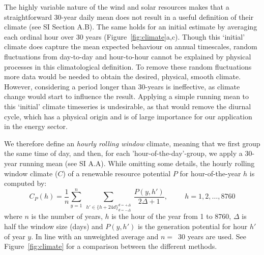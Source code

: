 \documentclass[12pt]{iopart}
\begin{document}
The highly variable nature of the wind and solar resources makes that a straightforward 30-year daily mean does not result in a useful definition of their climate (see SI Section A.B). 
The same holds for an initial estimate by averaging each ordinal hour over 30 years (Figure~\ref{fig:climate}a,c). 
Though this `initial' climate does capture the mean expected behaviour on annual timescales, random fluctuations from day-to-day and hour-to-hour cannot be explained by physical processes in this climatological definition. 
To remove these random fluctuations more data would be needed to obtain the desired, physical, smooth climate. 
However, considering a period longer than 30-years is ineffective, as climate change would start to influence the result. 
Applying a simple running mean to this `initial' climate timeseries is undesirable, as that would remove the diurnal cycle, which has a physical origin and is of large importance for our application in the energy sector.

We therefore define an \emph{hourly rolling window} climate, meaning that we first group the same time of day, and then, for each 'hour-of-the-day'-group, we apply a 30-year running mean (see SI A.A). 
While omitting some details, the hourly rolling window climate ($C$) of a renewable resource potential $P$ for hour-of-the-year $h$ is computed by:
\begin{equation}
        C_P(h) = \frac{1}{n}\sum_{y=1}^n ~\sum_{h' \in \{h+24d\}_{d=-\Delta}^{d=+\Delta}} ~ \frac{P(y, h')}{2 \Delta +1} ,\hspace{1cm} h = 1,2,\ldots,8760 \label{eq:HRWclim}
\end{equation}
where $n$ is the number of years, $h$ is the hour of the year from 1 to 8760, $\Delta$ is half the window size (days) and $P(y,h')$ is the generation potential for hour $h'$ of year $y$. 
In line with \parencite{Arguez2011} an unweighted average and $n=$~30 years are used.
See Figure~\ref{fig:climate} for a comparison between the different methods.
\end{document}

